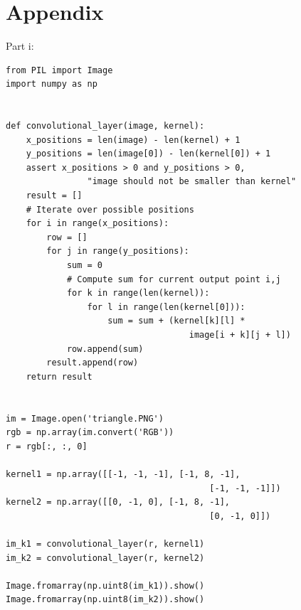 \documentclass[10pt]{article}
\begin{document}
\section*{Appendix}
Part i:
\begin{lstlisting}
from PIL import Image
import numpy as np


def convolutional_layer(image, kernel):
    x_positions = len(image) - len(kernel) + 1
    y_positions = len(image[0]) - len(kernel[0]) + 1
    assert x_positions > 0 and y_positions > 0,
                "image should not be smaller than kernel"
    result = []
    # Iterate over possible positions
    for i in range(x_positions):
        row = []
        for j in range(y_positions):
            sum = 0
            # Compute sum for current output point i,j
            for k in range(len(kernel)):
                for l in range(len(kernel[0])):
                    sum = sum + (kernel[k][l] *
                                    image[i + k][j + l])
            row.append(sum)
        result.append(row)
    return result


im = Image.open('triangle.PNG')
rgb = np.array(im.convert('RGB'))
r = rgb[:, :, 0]

kernel1 = np.array([[-1, -1, -1], [-1, 8, -1],
                                        [-1, -1, -1]])
kernel2 = np.array([[0, -1, 0], [-1, 8, -1], 
                                        [0, -1, 0]])

im_k1 = convolutional_layer(r, kernel1)
im_k2 = convolutional_layer(r, kernel2)

Image.fromarray(np.uint8(im_k1)).show()
Image.fromarray(np.uint8(im_k2)).show()
\end{lstlisting}
\end{document}
